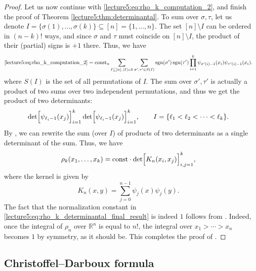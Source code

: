 \documentclass[letterpaper,11pt,oneside,reqno]{book}
\numberwithin{equation}{chapter}  %
\theoremstyle{definition}
\begin{document}
\begin{proof}
Let us now continue with \eqref{lecture5:eq:rho_k_computation_2}, and finish the proof of Theorem \ref{lecture5:thm:determinantal}.
To sum over $\sigma,\tau$, let us denote
$I=\{\sigma(1),\ldots,\sigma(k) \}\subseteq [n]=\{1,\ldots,n \}$.
The set $[n]\setminus I$ can be ordered in $(n-k)!$ ways, and since
$\sigma $ and $\tau$ must coincide on $[n]\setminus I$, the product of their
(partial) signs is $+1$ there. Thus, we have
\begin{equation*}
	\eqref{lecture5:eq:rho_k_computation_2}=
	\mathrm{const}_n\sum_{I\subseteq [n],\,|I|=k}
	\sum_{\sigma',\tau'\in S(I)}
	\operatorname{sgn}(\sigma')\operatorname{sgn}(\tau')
	\prod_{i=1}^k \psi_{\sigma'(i)-1}(x_i)\psi_{\tau'(i)-1}(x_i)  .
\end{equation*}
where $S(I)$ is the set of all permutations of \(I\).
The sum over $\sigma',\tau'$ is actually a product of two
sums over two independent permutations, and thus we get the product
of two determinants:
\begin{equation*}
	\det\Bigl[\psi_{\ell_i-1}(x_j)\Bigr]_{i=1}^{k}
	\det\Bigl[\psi_{\ell_i-1}(x_j)\Bigr]_{i=1}^{k},
	\qquad I=\{\ell_1<\ell_2<\cdots<\ell_k \}.
\end{equation*}
By , we can rewrite the sum (over $I$)
of products
of two determinants as a single determinant of the sum. Thus, we have
\begin{equation}
\rho_k(x_1,\dots,x_k)=
\mathrm{const}\cdot
\det\Bigl[K_n(x_i,x_j)\Bigr]_{i,j=1}^k, \label{lecture5:eq:rho_k_determinantal_final_result}
\end{equation}
where the kernel is given by
\[
K_n(x,y)=\sum_{j=0}^{n-1}\psi_j(x)\psi_j(y).
\]
The fact that the normalization constant 
in \eqref{lecture5:eq:rho_k_determinantal_final_result}
is indeed $1$ follows from .
Indeed, once the integral of $\rho_n$ over $\mathbb{R}^n$ is equal to \(n!\),
the integral over $x_1>\cdots>x_n$ becomes $1$ by symmetry, as it should be.
This completes the proof of .
\end{proof}

\subsection{Christoffel--Darboux formula}
\end{document}
